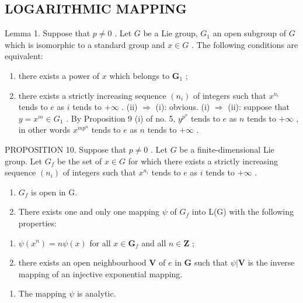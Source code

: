 \subsection{LOGARITHMIC MAPPING}

Lemma 1. Suppose that \(p \neq 0\) . Let \(G\) be a Lie group, \(G_1\) an open subgroup of \(G\) which is isomorphic to a standard group and \(x \in G\) . The following conditions are equivalent:

\begin{enumerate}
\def\labelenumi{(\roman{enumi})}
\item
  there exists a power of \(x\) which belongs to \(\mathbf{G}_1\) ;
\item
  there exists a strictly increasing sequence \((n_{i})\) of integers such that \(x^{n_{i}}\) tends to \(e\) as \(i\) tends to \(+\infty\) .
  (ii) \(\Rightarrow\) (i): obvious.
  (i) \(\Rightarrow\) (ii): suppose that \(y = x^{m} \in G_{1}\) . By Proposition 9 (i) of no. 5, \(y^{p^n}\) tends to \(e\) as \(n\) tends to \(+\infty\) , in other words \(x^{mp^n}\) tends to \(e\) as \(n\) tends to \(+\infty\) .
\end{enumerate}

PROPOSITION 10. Suppose that \(p \neq 0\) . Let \(G\) be a finite-dimensional Lie group. Let \(G_f\) be the set of \(x \in G\) for which there exists a strictly increasing sequence \((n_i)\) of integers such that \(x^{n_i}\) tends to \(e\) as \(i\) tends to \(+\infty\) .

\begin{enumerate}
\def\labelenumi{(\roman{enumi})}
\item
  \(G_{f}\) is open in G.
\item
  There exists one and only one mapping \(\psi\) of \(G_{f}\) into L(G) with the following properties:
\end{enumerate}

\begin{enumerate}
\def\labelenumi{(\alph{enumi})}
\item
  \(\psi (x^n) = n\psi (x)\) for all \(x\in \mathbf{G}_f\) and all \(n\in \mathbf{Z}\) ;
\item
  there exists an open neighbourhood \(\mathbf{V}\) of \(e\) in \(\mathbf{G}\) such that \(\psi |\mathbf{V}\) is the inverse mapping of an injective exponential mapping.
\end{enumerate}

\begin{enumerate}
\def\labelenumi{(\roman{enumi})}
\setcounter{enumi}{2}
\tightlist
\item
  The mapping \(\psi\) is analytic.
\end{enumerate}

